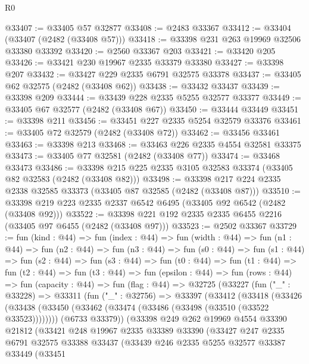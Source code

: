 \begin{lexlean}{R0}
\begin{coremodule}
@33407 := @33405 @57 @32877
@33408 := @2483 @33367
@33412 := @33404 (@33407 (@2482 (@33408 @57)))
@33418 := @33398 @231 @263 @19969 @32506 @33380 @33392
@33420 := @2560 @33367 @203
@33421 := @33420 @205
@33426 := @33421 @230 @19967 @2335 @33379 @33380
@33427 := @33398 @207
@33432 := @33427 @229 @2335 @6791 @32575 @33378
@33437 := @33405 @62 @32575 (@2482 (@33408 @62))
@33438 := @33432 @33437
@33439 := @33398 @209
@33444 := @33439 @228 @2335 @5255 @32577 @33377
@33449 := @33405 @67 @32577 (@2482 (@33408 @67))
@33450 := @33444 @33449
@33451 := @33398 @211
@33456 := @33451 @227 @2335 @5254 @32579 @33376
@33461 := @33405 @72 @32579 (@2482 (@33408 @72))
@33462 := @33456 @33461
@33463 := @33398 @213
@33468 := @33463 @226 @2335 @4554 @32581 @33375
@33473 := @33405 @77 @32581 (@2482 (@33408 @77))
@33474 := @33468 @33473
@33486 := @33398 @215 @225 @2335 @3105 @32583 @33374 (@33405 @82 @32583 (@2482 (@33408 @82)))
@33498 := @33398 @217 @224 @2335 @2338 @32585 @33373 (@33405 @87 @32585 (@2482 (@33408 @87)))
@33510 := @33398 @219 @223 @2335 @2337 @6542 @6495 (@33405 @92 @6542 (@2482 (@33408 @92)))
@33522 := @33398 @221 @192 @2335 @2335 @6455 @2216 (@33405 @97 @6455 (@2482 (@33408 @97)))
@33523 := @2502 @33367
@33729 := fun (kind : @44) =>
  fun (index : @44) =>
  fun (width : @44) =>
  fun (n1 : @44) =>
  fun (n2 : @44) =>
  fun (n3 : @44) =>
  fun (s0 : @44) =>
  fun (s1 : @44) =>
  fun (s2 : @44) =>
  fun (s3 : @44) =>
  fun (t0 : @44) =>
  fun (t1 : @44) =>
  fun (t2 : @44) =>
  fun (t3 : @44) =>
  fun (epsilon : @44) =>
  fun (rows : @44) =>
  fun (capacity : @44) =>
  fun (flag : @44) =>
  @32725
    (@33227
      (fun ("_" : @33228) =>
      @33311
        (fun ("_" : @32756) =>
        @33397
          (@33412
            (@33418
              (@33426
                (@33438 (@33450 (@33462 (@33474 (@33486 (@33498 (@33510 (@33522 @33523))))))))
                (@6733 @33379))
              (@33398
                @249
                @262
                @19969
                @4554
                @33390
                @21812
                (@33421
                  @248
                  @19967
                  @2335
                  @33389
                  @33390
                  (@33427
                    @247
                    @2335
                    @6791
                    @32575
                    @33388
                    @33437
                    (@33439
                      @246
                      @2335
                      @5255
                      @32577
                      @33387
                      @33449
                      (@33451

\end{coremodule}
\end{lexlean}
